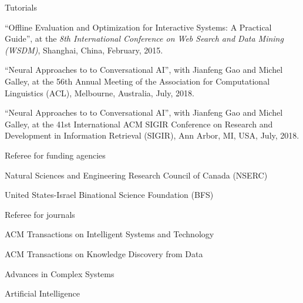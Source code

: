\documentclass[10pt,twoside,letterpaper]{article}
\newcommand{\venuefont}[1]{{\textit{#1}}}
\newcommand{\negitemspace}{\vspace{1mm}}
\begin{document}
\begin{compactitem}
\begin{compactitem}
\end{compactitem}

\item{Tutorials} \negitemspace

\begin{compactitem}

\item{``Offline Evaluation and Optimization for Interactive Systems: A Practical Guide'', at the \venuefont{8th International Conference on Web Search and Data Mining (WSDM)}, Shanghai, China, February, 2015.}

\item{``Neural Approaches to to Conversational AI'', with Jianfeng Gao and Michel Galley, at the 56th
Annual Meeting of the Association for Computational Linguistics (ACL), Melbourne, Australia, July, 2018.}

\item{``Neural Approaches to to Conversational AI'', with Jianfeng Gao and Michel Galley, at the 41st
International ACM SIGIR Conference on Research and Development in Information Retrieval (SIGIR), Ann Arbor, MI, USA, July, 2018.}

\end{compactitem} \negitemspace

\item{Referee for funding agencies} \negitemspace

\begin{compactitem}

\item{Natural Sciences and Engineering Research Council of Canada (NSERC)}

\item{United States-Israel Binational Science Foundation (BFS)}

\end{compactitem}

\item{Referee for journals} \negitemspace

\begin{compactitem}

\item{ACM Transactions on Intelligent Systems and Technology}

\item{ACM Transactions on Knowledge Discovery from Data}

\item{Advances in Complex Systems}

\item{Artificial Intelligence}


\end{compactitem}
\end{compactitem}
\end{document}
